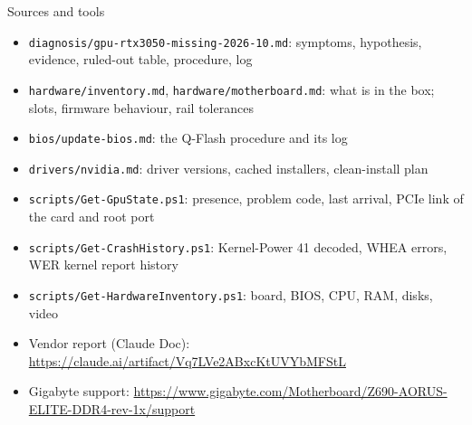 \documentclass[aspectratio=169,11pt]{beamer}
\begin{document}
\begin{frame}{Sources and tools}
  \footnotesize
  \begin{itemize}\setlength{\itemsep}{0.3em}
    \item \texttt{diagnosis/gpu-rtx3050-missing-2026-10.md}: symptoms, hypothesis, evidence, ruled-out table, procedure, log
    \item \texttt{hardware/inventory.md}, \texttt{hardware/motherboard.md}: what is in the box; slots, firmware behaviour, rail tolerances
    \item \texttt{bios/update-bios.md}: the Q-Flash procedure and its log
    \item \texttt{drivers/nvidia.md}: driver versions, cached installers, clean-install plan
    \item \texttt{scripts/Get-GpuState.ps1}: presence, problem code, last arrival, PCIe link of the card and root port
    \item \texttt{scripts/Get-CrashHistory.ps1}: Kernel-Power 41 decoded, WHEA errors, WER kernel report history
    \item \texttt{scripts/Get-HardwareInventory.ps1}: board, BIOS, CPU, RAM, disks, video
    \item Vendor report (Claude Doc): \url{https://claude.ai/artifact/Vq7LVe2ABxcKtUVYbMFStL}
    \item Gigabyte support: \url{https://www.gigabyte.com/Motherboard/Z690-AORUS-ELITE-DDR4-rev-1x/support}
  \end{itemize}
\end{frame}
\end{document}

